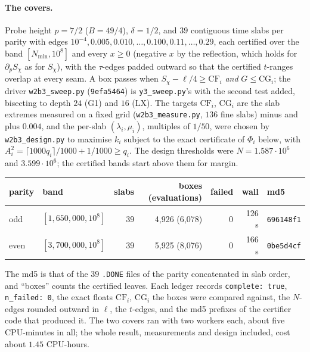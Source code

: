 \documentclass[11pt]{article}
\theoremstyle{definition}
\newcommand{\lean}[1]{\texttt{#1}}
\begin{document}
\paragraph{The covers.} Probe height $p = 7/2$ ($B = 49/4$), $\delta = 1/2$, and $39$ contiguous time slabs per parity with edges $10^{-4}, 0.005, 0.010, \dots, 0.100, 0.11, \dots, 0.29$, each certified over the band $[N_{\min}, 10^8]$ and every $x \ge 0$ (negative $x$ by the reflection, which holds for $\partial_pS_\chi$ as for $S_\chi$), with the $\tau$-edges padded outward so that the certified $t$-ranges overlap at every seam. A box passes when $S_\chi - \ell/4 \ge \mathrm{CF}_i$ \emph{and} $G \le \mathrm{CG}_i$; the driver \lean{w2b3\_sweep.py} (\lean{9efa5464}) is \lean{y3\_sweep.py}'s with the second test added, bisecting to depth $24$ (G1) and $16$ (LX). The targets $\mathrm{CF}_i$, $\mathrm{CG}_i$ are the slab extremes measured on a fixed grid (\lean{w2b3\_measure.py}, $136$ fine slabs) minus and plus $0.004$, and the per-slab $(\lambda_i, \mu_i)$, multiples of $1/50$, were chosen by \lean{w2b3\_design.py} to maximise $k_i$ subject to the exact certificate of $\Phi_i$ below, with $A_i^2 = \lceil 1000q_i\rceil/1000 + 1/1000 \ge q_i$. The design thresholds were $N = 1.587\cdot10^6$ and $3.599\cdot10^6$; the certified bands start above them for margin.
\begin{center}\small
\begin{tabular}{@{}llrrrrl@{}}
\toprule
parity & band & slabs & boxes (evaluations) & failed & wall & md5 \\
\midrule
odd & $[1{,}650{,}000, 10^8]$ & 39 & 4,926 (6,078) & 0 & 126 s & \lean{696148f1} \\
even & $[3{,}700{,}000, 10^8]$ & 39 & 5,925 (8,076) & 0 & 166 s & \lean{0be5d4cf} \\
\bottomrule
\end{tabular}
\end{center}
The md5 is that of the $39$ \lean{.DONE} files of the parity concatenated in slab order, and ``boxes'' counts the certified leaves. Each ledger records \lean{complete: true}, \lean{n\_failed: 0}, the exact floats $\mathrm{CF}_i$, $\mathrm{CG}_i$ the boxes were compared against, the $N$-edges rounded outward in $\ell$, the $t$-edges, and the md5 prefixes of the certifier code that produced it. The two covers ran with two workers each, about five CPU-minutes in all; the whole result, measurements and design included, cost about $1.45$ CPU-hours.
\end{document}
